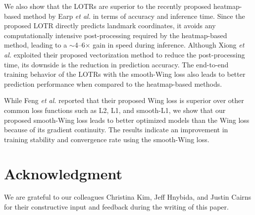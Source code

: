 \documentclass[journal]{IEEEtran}
\begin{document}
We also show that the LOTRs are superior to the recently proposed heatmap-based method by Earp \textit{et al.} \cite{earp2021sub} in terms of accuracy and inference time. 
Since the proposed LOTR directly predicts landmark coordinates, it avoids any computationally intensive post-processing required by the heatmap-based method, leading to a $\sim$4--6$\times$ gain in speed during inference. 
Although Xiong \textit{et al.} \cite{xiong2020} exploited their proposed vectorization method to reduce the post-processing time, its downside is the reduction in prediction accuracy.
The end-to-end training behavior of the LOTRs with the smooth-Wing loss also leads to better prediction performance when compared to the heatmap-based methods.

While Feng \textit{et al.} \cite{Feng2017} reported that their proposed Wing loss is superior over other common loss functions such as L2, L1, and smooth-L1, we show that our proposed smooth-Wing loss leads to better optimized models than the Wing loss because of its gradient continuity. 
The results indicate an improvement in training stability and convergence rate using the smooth-Wing loss. 





\section*{Acknowledgment}

We are grateful to our colleagues Christina Kim, Jeff Hnybida, and Justin Cairns for their constructive input and feedback during the writing of this paper. 



\end{document}
